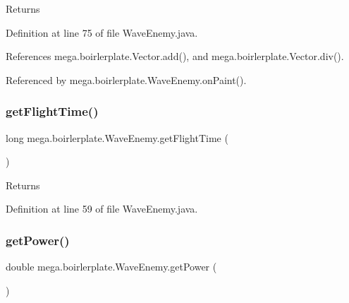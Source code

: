 \begin{DoxyReturn}{Returns}

\end{DoxyReturn}


Definition at line 75 of file Wave\+Enemy.\+java.



References mega.\+boirlerplate.\+Vector.\+add(), and mega.\+boirlerplate.\+Vector.\+div().



Referenced by mega.\+boirlerplate.\+Wave\+Enemy.\+on\+Paint().

\mbox{\label{classmega_1_1boirlerplate_1_1_wave_enemy_ae77d428fc69cc10d79e94cca3f8f1eba}} 
\subsubsection{\texorpdfstring{get\+Flight\+Time()}{getFlightTime()}}
{\footnotesize\ttfamily long mega.\+boirlerplate.\+Wave\+Enemy.\+get\+Flight\+Time (\begin{DoxyParamCaption}{ }\end{DoxyParamCaption})}

\begin{DoxyReturn}{Returns}

\end{DoxyReturn}


Definition at line 59 of file Wave\+Enemy.\+java.

\mbox{\label{classmega_1_1boirlerplate_1_1_wave_enemy_a8100fd097abd774c5a0690e5896629ba}} 
\subsubsection{\texorpdfstring{get\+Power()}{getPower()}}
{\footnotesize\ttfamily double mega.\+boirlerplate.\+Wave\+Enemy.\+get\+Power (\begin{DoxyParamCaption}{ }\end{DoxyParamCaption})}

